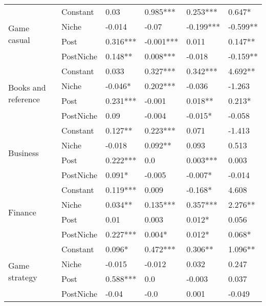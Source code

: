 \begin{longtable}[h!]{llllll}
\cline{1-6}
\multirow{4}{*}{Game casual} & Constant &                0.03 &    0.985*** &   0.253*** &     0.647* \\
          & Niche &              -0.014 &       -0.07 &  -0.199*** &   -0.599** \\
          & Post &            0.316*** &   -0.001*** &      0.011 &    0.147** \\
          & PostNiche &             0.148** &    0.008*** &     -0.018 &   -0.159** \\
\cline{1-6}
\multirow{4}{*}{Books and reference} & Constant &               0.033 &    0.327*** &   0.342*** &    4.692** \\
          & Niche &             -0.046* &    0.202*** &     -0.036 &     -1.263 \\
          & Post &            0.231*** &      -0.001 &    0.018** &     0.213* \\
          & PostNiche &                0.09 &      -0.004 &    -0.015* &     -0.058 \\
\cline{1-6}
\multirow{4}{*}{Business} & Constant &             0.127** &    0.223*** &      0.071 &     -1.413 \\
          & Niche &              -0.018 &     0.092** &      0.093 &      0.513 \\
          & Post &            0.222*** &         0.0 &   0.003*** &      0.003 \\
          & PostNiche &              0.091* &      -0.005 &    -0.007* &     -0.014 \\
\cline{1-6}
\multirow{4}{*}{Finance} & Constant &            0.119*** &       0.009 &    -0.168* &      4.608 \\
          & Niche &             0.034** &    0.135*** &   0.357*** &    2.276** \\
          & Post &                0.01 &       0.003 &     0.012* &      0.056 \\
          & PostNiche &            0.227*** &      0.004* &     0.012* &     0.068* \\
\cline{1-6}
\multirow{4}{*}{Game strategy} & Constant &              0.096* &    0.472*** &    0.306** &    1.096** \\
          & Niche &              -0.015 &      -0.012 &      0.032 &      0.247 \\
          & Post &            0.588*** &         0.0 &     -0.003 &      0.037 \\
          & PostNiche &               -0.04 &        -0.0 &      0.001 &     -0.049 \\

\end{longtable}
